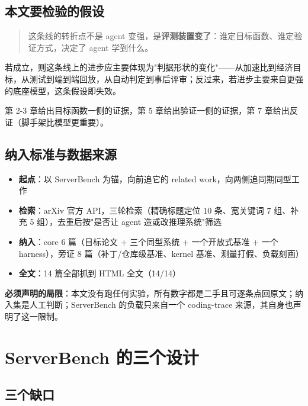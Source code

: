 \subsection{本文要检验的假设}

\begin{quote}\small
这条线的转折点不是 agent 变强，是\textbf{评测装置变了}：谁定目标函数、谁定验证方式，决定了 agent 学到什么。

\end{quote}

若成立，则这条线上的进步应主要体现为"判据形状的变化"——从加速比到经济目标，从测试到端到端回放，从自动判定到事后评审；反过来，若进步主要来自更强的底座模型，这条假设即失效。


第 2-\hspace{0pt}3 章给出目标函数一侧的证据，第 5 章给出验证一侧的证据，第 7 章给出反证（脚手架比模型更重要）。


\subsection{纳入标准与数据来源}

\begin{itemize}
  \item \textbf{起点}：以 ServerBench 为锚，向前追它的 related work，向两侧追同期同型工作
  \item \textbf{检索}：arXiv 官方 API，三轮检索（精确标题定位 10 条、宽关键词 7 组、补充 5 组），去重后按"是否让 agent 造或改推理系统"筛选
  \item \textbf{纳入}：core 6 篇（目标论文 + 三个同型系统 + 一个开放式基准 + 一个 harness），旁证 8 篇（补丁/仓库级基准、kernel 基准、测量打假、负载刻画）
  \item \textbf{全文}：14 篇全部抓到 HTML 全文（14/14）
\end{itemize}

 \textbf{必须声明的局限}：本文没有跑任何实验，所有数字都是二手且可逐条点回原文；纳入集是人工判断；ServerBench 的负载只来自一个 coding-trace 来源，其自身也声明了这一限制。


\section{ServerBench 的三个设计}

\subsection{三个缺口}

